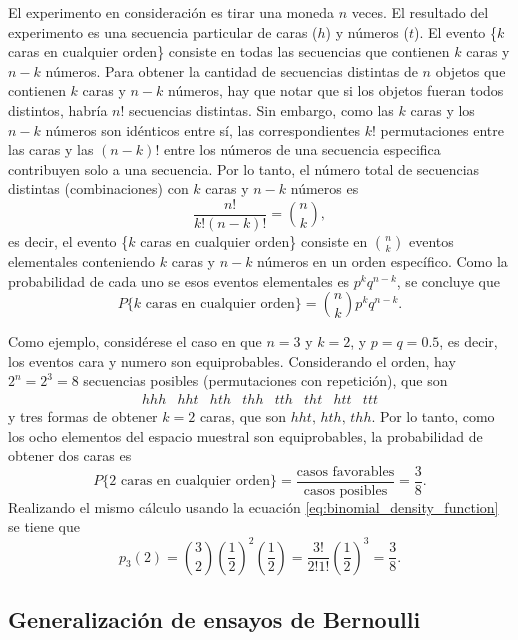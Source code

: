 \documentclass[a4paper]{report}
\begin{document}
El experimento en consideración es tirar una moneda \(n\) veces. El resultado del experimento es una secuencia particular de caras (\(h\)) y números (\(t\)). El evento \{\(k\) caras en cualquier orden\} consiste en todas las secuencias que contienen \(k\) caras y \(n-k\) números. Para obtener la cantidad de secuencias distintas de \(n\) objetos que contienen \(k\) caras y \(n-k\) números, hay que notar que si los objetos fueran todos distintos, habría \(n!\) secuencias distintas. Sin embargo, como las \(k\) caras y los \(n-k\) números son idénticos entre sí, las correspondientes \(k!\) permutaciones entre las caras y las \((n-k)!\) entre los números de una secuencia especifica contribuyen solo a una secuencia. Por lo tanto, el número total de secuencias distintas (combinaciones) con \(k\) caras y \(n-k\) números es
\begin{equation}\label{eq:combinations_definition}
 \frac{n!}{k!(n-k)!}=\binom{n}{k},
\end{equation}
es decir, el evento \{\(k\) caras en cualquier orden\} consiste en \(\binom{n}{k}\) eventos elementales conteniendo \(k\) caras y \(n-k\) números en un orden específico. Como la probabilidad de cada uno se esos eventos elementales es \(p^{k}q^{n-k}\), se concluye que
\[
 P\{k\textrm{ caras en cualquier orden}\}=\binom{n}{k}p^{k}q^{n-k}.
\]

Como ejemplo, considérese el caso en que \(n=3\) y \(k=2\), y \(p=q=0.5\), es decir, los eventos cara y numero son equiprobables. Considerando el orden, hay \(2^n=2^3=8\) secuencias posibles (permutaciones con repetición), que son
\[
 \begin{array}{llllllll}
  hhh & hht & hth & thh & tth & tht & htt & ttt
 \end{array}
\]
y tres formas de obtener \(k=2\) caras, que son \( hht,\,hth,\,thh\). Por lo tanto, como los ocho elementos del espacio muestral son equiprobables, la probabilidad de obtener dos caras es
\[
 P\{2\textrm{ caras en cualquier orden}\}=\frac{\textrm{casos favorables}}{\textrm{casos posibles}}=\frac{3}{8}.
\]
Realizando el mismo cálculo usando la ecuación \ref{eq:binomial_density_function} se tiene que
\[
 p_3(2)=\binom{3}{2}\left(\frac{1}{2}\right)^2\left(\frac{1}{2}\right)=\frac{3!}{2!1!}\left(\frac{1}{2}\right)^3=\frac{3}{8}.
\]

\subsection{Generalización de ensayos de Bernoulli}
\end{document}
